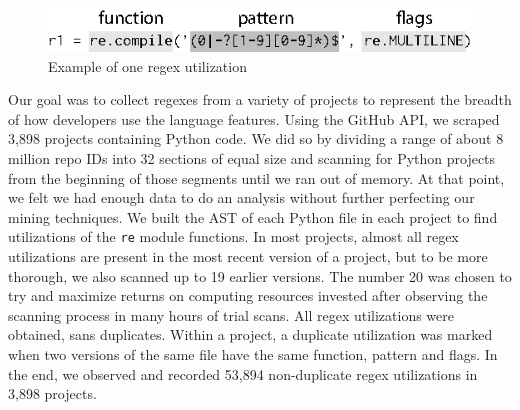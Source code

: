 \begin{figure}[tb]
\centering
\includegraphics[width=\columnwidth]{illustrations/exampleUsage.eps}
\vspace{-12pt}
\caption{Example of one regex utilization}
\vspace{-6pt}
\label{fig:exampleUsage}
\end{figure}

Our goal was to collect regexes from a variety of projects to represent the breadth of how developers use the language features.
Using the GitHub API, we scraped 3,898 projects containing Python code.
We did so  by dividing a range of about 8 million repo IDs
into 32 sections of equal size and scanning  for Python projects from the beginning of those
segments until we ran out of memory. At that point, we felt we had enough data
to do an analysis without further perfecting our mining techniques. We built
the AST of each Python file in each project to find utilizations of the {\tt re} module
functions. In most projects, almost all regex utilizations are present in the
most recent version of a project, but to be more thorough, we also scanned up
to 19 earlier versions. The number 20 was chosen to try and maximize returns on
computing resources invested after observing the scanning process in many hours
of trial scans.
All regex utilizations were obtained, sans duplicates. Within a project, a duplicate utilization was marked when two versions of the same file have the same function, pattern and flags.  In the end, we observed and recorded 53,894 non-duplicate regex utilizations in 3,898 projects.

